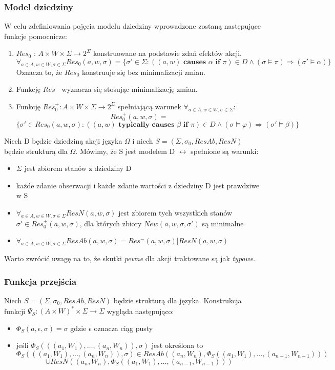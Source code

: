 \documentclass{article}
\begin{document}
\subsubsection{Model dziedziny}
W celu zdefiniowania pojęcia modelu dziedziny wprowadzone zostaną następujące funkcje pomocnicze:
\begin{enumerate}
	\item $Res_{0}$ : $A \times W \times \Sigma \to 2^{\Sigma}$ konstruowane na podstawie zdań efektów akcji.
	\[ \forall_{a \in A, w \in W, \sigma \in \Sigma} Res_{0}(a,w,\sigma) = \{\sigma' \in \Sigma: ((a, w) \textbf{ causes } \alpha \textbf{ if } \pi) \in D \land (\sigma \models \pi) \Rightarrow (\sigma' \models \alpha) \}  \]
	Oznacza to, że $Res_{0}$ konstruuje się bez minimalizacji zmian.
	\item Funkcję $Res^{-}$ wyznacza się stosując minimalizację zmian.
	\item Funkcję $Res_{0}^{+} : A \times W \times \Sigma \to 2^{\Sigma}$ spełniającą warunek $\forall_{a \in A, w \in W, \sigma \in \Sigma}$:
	\[ Res_{0}^{+}(a, w,\sigma) = \]
	\[ \{\sigma' \in Res_{0}(a, w,\sigma) : ((a, w) \textbf{ typically causes } \beta \textbf{ if } \pi) \in D \land (\sigma \models \varphi) \Rightarrow (\sigma' \models \beta) \}  \]
\end{enumerate}

Niech D będzie dziedziną akcji języka $\Omega$ i niech $S=(\Sigma, \sigma_{0}, ResAb, ResN)$ będzie strukturą dla $\Omega$. Mówimy, że S jest modelem D $\leftrightarrow$ spełnione są warunki:
\begin{itemize}
	\item $\Sigma$ jest zbiorem stanów z dziedziny D
	\item każde zdanie obserwacji i każde zdanie wartości z dziedziny D jest prawdziwe w S
	\item $\forall_{ a \in A, w \in W, \sigma \in \Sigma } ResN(a, w, \sigma)$ jest zbiorem tych wszystkich stanów $\sigma' \in Res_{0}^{+}(a, w, \sigma)$, dla których zbiory $New(a, w, \sigma, \sigma')$ są minimalne
	\item $\forall_{a \in A, w \in W, \sigma \in \Sigma} ResAb(a, w, \sigma) = Res^{-}(a, w, \sigma) | ResN(a, w, \sigma)$
\end{itemize}
Warto zwrócić uwagę na to, że skutki \textit{pewne} dla akcji traktowane są jak \textit{typowe}.

\subsubsection{Funkcja przejścia}
Niech $S=(\Sigma,\sigma_{0},ResAb,ResN)$ będzie strukturą dla języka. Konstrukcja funkcji $\Psi_{S} : (A \times W)^{*} \times \Sigma \to \Sigma$ wygląda następująco:
\begin{itemize}
	\item $\Phi_{S}(a,\epsilon,\sigma)=\sigma$ gdzie $\epsilon$ oznacza ciąg pusty
	\item jeśli $\Phi_{S}(((a_{1}, W_{1}), \dots, (a_{n}, W_{n})),\sigma)$ jest określona to
	\[\Phi_{S}(((a_{1}, W_{1}), \dots, (a_{n}, W_{n})),\sigma) \in ResAb((a_{n}, W_{n}), \Phi_{S}((a_{1}, W_{1}),\dots,(a_{n-1}, W_{n-1}))) \]
	\[ \cup ResN((a_{n}, W_{n}), \Phi_{S}((a_{1}, W_{1}),\dots,(a_{n-1}, W_{n-1})))\]
\end{itemize}
\end{document}
